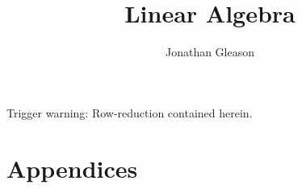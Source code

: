 \documentclass[print,title,oneside]{text}
\title{Linear Algebra}
\author{Jonathan Gleason}
\begin{document}

Trigger warning:  Row-reduction contained herein.



\pagestyle{empty} %

\tableofcontents %

\newpage



\cleardoublepage %

\pagestyle{fancy} %
















\appendix %
\part*{Appendices} %



\stopcontents %

\nocite{*} %
\printbibliography

\printindex
\printindex[notation]
\end{document}
